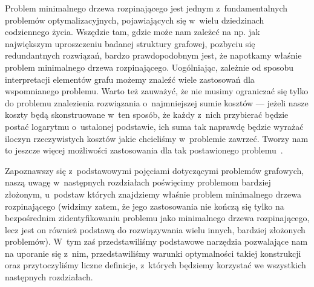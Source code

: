 Problem minimalnego drzewa rozpinającego jest jednym z~fundamentalnych problemów optymalizacyjnych, pojawiających się w~wielu dziedzinach codziennego życia.
Wszędzie tam, gdzie może nam zależeć na np. jak największym uproszczeniu badanej struktury grafowej, pozbyciu się redundantnych rozwiązań, bardzo prawdopodobnym jest, że napotkamy właśnie problem minimalnego drzewa rozpinającego.
Uogólniając, zależnie od sposobu interpretacji elementów grafu możemy znaleźć wiele zastosowań dla wspomnianego problemu.
Warto też zauważyć, że nie musimy ograniczać się tylko do problemu znalezienia rozwiązania o~najmniejszej sumie kosztów --- jeżeli nasze koszty będą skonstruowane w~ten sposób, że każdy z~nich przybierać będzie postać logarytmu o~ustalonej podstawie, ich suma tak naprawdę będzie wyrażać iloczyn rzeczywistych kosztów jakie chcieliśmy w~problemie zawrzeć.
Tworzy nam to jeszcze więcej możliwości zastosowania dla tak postawionego problemu~\cite[$512$--$516$]{Ahuja:1993:NFT:137406}.

Zapoznawszy się z~podstawowymi pojęciami dotyczącymi problemów grafowych, naszą uwagę w~następnych rozdziałach poświęcimy problemom bardziej złożonym, u~podstaw których znajdziemy właśnie problem minimalnego drzewa rozpinającego (widzimy zatem, że jego zastosowania nie kończą się tylko na bezpośrednim zidentyfikowaniu problemu jako minimalnego drzewa rozpinającego, lecz jest on również podstawą do rozwiązywania wielu innych, bardziej złożonych problemów).
W~tym zaś przedstawiliśmy podstawowe narzędzia pozwalające nam na uporanie się z~nim, przedstawiliśmy warunki optymalności takiej konstrukcji oraz przytoczyliśmy liczne definicje, z~których będziemy korzystać we wszystkich następnych rozdziałach.